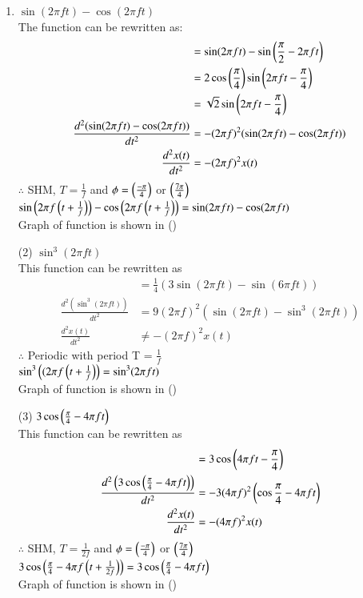 \documentclass[journal,12pt,onecolumn]{IEEEtran}
\theoremstyle{remark}
\begin{document}
   \begin{enumerate}
   \begin{table}[!ht]
    \centering
        
    \caption{input parameters}
    \label{tab:}
\end{table}
\item $\sin(2\pi f t)- \cos(2\pi f t)$\\
The function can be rewritten as:
 \begin{align}
  &= \sin(2\pi f t) - \sin\left(\frac{\pi}{2} - 2\pi f t\right)\\
  &=2 \cos\left(\frac{\pi}{4}\right) \sin\left(2\pi f t - \frac{\pi}{4}\right)\\
  &=\sqrt{2}\sin\left(2\pi f t - \frac{\pi}{4}\right)\\
  \frac{d^2(\sin(2\pi f t)- \cos(2\pi f t))}{dt^2}&=-(2\pi f)^2(\sin(2\pi f t)- \cos(2\pi f t))\\
     \frac{d^2 x(t)}{dt^2} &= - (2\pi f)^2 x(t)
 \end{align}
 \(\therefore\) SHM, \(T = \frac{1}{f}\) and \(\phi = \left(\frac{-\pi}{4}\right)\) or \(\left(\frac{7\pi}{4}\right)\)\\
 $\sin\left(2\pi f\left(t+\frac{1}{f}\right)\right)- \cos\left(2\pi f\left(t+\frac{1}{f}\right)\right)=\sin(2\pi f t)- \cos(2\pi f t)$\\
 Graph of function is shown in ()

    \item[(2)] $\sin^3(2\pi f t)$\\

 This function can be rewritten as\\ 
 \begin{align}
  &=\frac{1}{4}(3\sin(2\pi f t)-\sin(6\pi  f t))\\
  \frac{d^2(\sin^3(2\pi f t))}{dt^2}&=9(2\pi f)^2(\sin(2\pi ft)-\sin^3(2\pi ft))\\
   \frac{d^2 x(t)}{dt^2} &\neq - (2\pi f)^2 x(t)
 \end{align}
 $\therefore$ Periodic with period {T} = $\frac{1}{f}$ \\
 $\sin^3\left((2\pi f \left(t+\frac{1}{f}\right)\right)=\sin^3(2\pi f t)$\\
Graph of function is shown in ()
\\
    \item[(3)] $3\cos\left(\frac{\pi}{4}-4\pi f t\right)$\\

This function can be rewritten as\\ 
 \begin{align}
  &=3\cos\left(4\pi f t-\frac{\pi}{4}\right)\\
  \frac{d^2\left(3\cos\left(\frac{\pi}{4}-4\pi f t\right)\right)}{dt^2}&=-3(4\pi f)^2\left(\cos\frac{\pi}{4}-4\pi f t\right)\\
  \frac{d^2 x(t)}{dt^2} &= - (4\pi f)^2 x(t)
 \end{align}
 $\therefore$  SHM, $T = \frac{1}{2f}$  and  $\phi=\left(\frac{-\pi}{4}\right)$ or $\left(\frac{7\pi}{4}\right)$ \\
 $3\cos\left(\frac{\pi}{4}-4\pi f \left(t+\frac{1}{2f}\right)\right)=3\cos\left(\frac{\pi}{4}-4\pi f t\right)$\\
 Graph of function is shown in ()
 \\


\end{enumerate}
\end{document}
